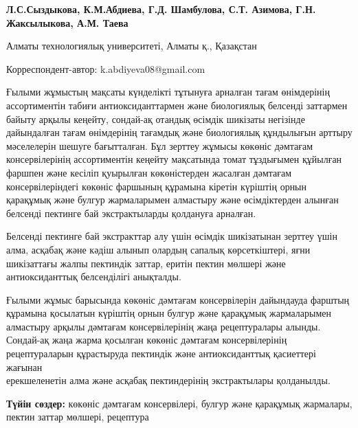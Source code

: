 
\begin{articleheader}

{\bfseries
Л.С.Сыздыкова,
К.М.Абдиева\textsuperscript{\envelope },
Г.Д. Шамбулова,
С.Т. Азимова,
Г.Н. Жаксылыкова,
А.М. Таева
}
\end{articleheader}

\begin{affiliation}
Алматы технологиялық университеті, Алматы қ., Қазақстан

\raggedright \textsuperscript{\envelope }Корреспондент-автор: k.abdiyeva08@gmail.com
\end{affiliation}

Ғылыми жұмыстың мақсаты күнделікті тұтынуға арналған тағам өнімдерінің
ассортиментін табиғи антиоксиданттармен және биологиялық белсенді
заттармен байыту арқылы кеңейту, сондай-ақ отандық өсімдік шикізаты
негізінде дайындалған тағам өнімдерінің тағамдық және биологиялық
құндылығын арттыру мәселелерін шешуге бағытталған. Бұл зерттеу жұмысы
көкөніс дәмтағам консервілерінің ассортиментін кеңейту мақсатында томат
тұздығымен құйылған фаршпен және кесіліп қуырылған көкөністерден
жасалған дәмтағам консервілеріндегі көкөніс фаршының құрамына кіретін
күріштің орнын қарақұмық және булгур жармаларымен алмастыру және
өсімдіктерден алынған белсенді пектинге бай экстрактыларды қолдануға
арналған.

Белсенді пектинге бай экстракттар алу үшін өсімдік шикізатынан зерттеу
үшін алма, асқабақ және кәдіш алынып олардың сапалық көрсеткіштері, яғни
шикізаттағы жалпы пектиндік заттар, еритін пектин мөлшері және
антиоксиданттық белсенділігі анықталды.

Ғылыми жұмыс барысында көкөніс дәмтағам консервілерін дайындауда фарштың
құрамына қосылатын күріштің орнын булгур және қарақұмық жармаларымен
алмастыру арқылы дәмтағам консервілерінің жаңа рецептуралары алынды.
Сондай-ақ жаңа жарма қосылған көкөніс дәмтағам консервілерінің
рецептураларын құрастыруда пектиндік және антиоксиданттық қасиеттері
жағынан \\ерекшеленетін алма және асқабақ пектиндерінің экстрактылары
қолданылды.

{\bfseries Түйін сөздер:} көкөніс дәмтағам консервілері, булгур және
қарақұмық жармалары, пектин заттар мөлшері, рецептура

